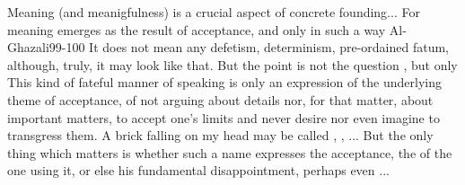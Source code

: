 Meaning (and meanigfulness) is a crucial aspect of concrete founding... For
meaning emerges as the result of acceptance, and only in such a way
\citet{What strikes you was not there to miss you; what misses you was not there
  to strike you.}{Al-Ghazali}{99-100 } It does not
mean any defetism, 
determinism, pre-ordained fatum, although, truly, it may look like that. But the
point is not the question , but only
 This kind of fateful manner of speaking
is only an expression of the underlying theme of  acceptance, of not
arguing about details nor, for that matter, about important matters, to accept
one's limits and never desire nor even imagine to transgress them. A brick
falling on my head may be called , , ... But
the only thing which matters is whether such a name expresses the 
acceptance, the  of the one using it, or else his fundamental
disappointment, perhaps even ...





